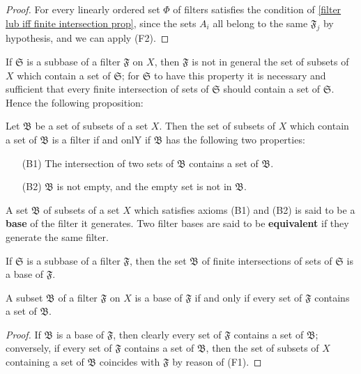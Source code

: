 \begin{proof}
For every linearly ordered set $\Phi$ of filters satisfies the condition of \cref{filter lub iff finite intersection prop}, since the sets $A_i$ all belong to the same $\mathfrak{F}_j$ by hypothesis, and we can apply (F2).
\end{proof}
If $\mathfrak{S}$ is a subbase of a filter $\mathfrak{F}$ on $X$, then $\mathfrak{F}$ is not in general the set of subsets of $X$ which contain a set of $\mathfrak{S}$; for $\mathfrak{S}$ to have this property it is necessary and sufficient that every finite intersection of sets of $\mathfrak{S}$ should contain a set of $\mathfrak{S}$. Hence the following proposition:
\begin{proposition}
Let $\mathfrak{B}$ be a set of subsets of a set $X$. Then the set of subsets of $X$ which contain a set of $\mathfrak{B}$ is a filter if and onlY if $\mathfrak{B}$ has the following two properties:
\begin{itemize}
\item[(B1)] The intersection of two sets of $\mathfrak{B}$ contains a set of $\mathfrak{B}$.
\item[(B2)] $\mathfrak{B}$ is not empty, and the empty set is not in $\mathfrak{B}$.
\end{itemize}
\end{proposition}
\begin{definition}
A set $\mathfrak{B}$ of subsets of a set $X$ which satisfies axioms (B1) and (B2) is said to be a \textbf{base} of the filter it generates. Two filter bases are said to be \textbf{equivalent} if they generate the same filter.
\end{definition}
If $\mathfrak{S}$ is a subbase of a filter $\mathfrak{F}$, then the set $\mathfrak{B}$ of finite intersections of sets of $\mathfrak{S}$ is a base of $\mathfrak{F}$.
\begin{proposition}\label{filter base iff}
A subset $\mathfrak{B}$ of a filter $\mathfrak{F}$ on $X$ is a base of $\mathfrak{F}$ if and only if every set of $\mathfrak{F}$ contains a set of $\mathfrak{B}$.
\end{proposition}
\begin{proof}
If $\mathfrak{B}$ is a base of $\mathfrak{F}$, then clearly every set of $\mathfrak{F}$ contains a set of $\mathfrak{B}$; conversely, if every set of $\mathfrak{F}$ contains a set of $\mathfrak{B}$, then the set of subsets of $X$ containing a set of $\mathfrak{B}$ coincides with $\mathfrak{F}$ by reason of (F1).
\end{proof}
